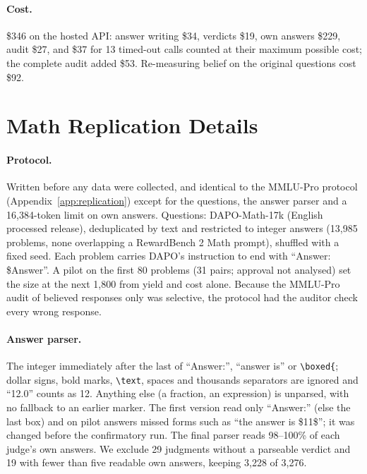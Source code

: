 \documentclass[11pt]{article}
\begin{document}
\paragraph{Cost.} \$346 on the hosted API: answer writing \$34, verdicts \$19, own answers \$229, audit \$27,
and \$37 for 13 timed-out calls counted at their maximum possible cost; the complete audit added \$53.
Re-measuring belief on the original questions cost \$92.

\section{Math Replication Details}
\label{app:math}

\paragraph{Protocol.} Written before any data were collected, and identical to the MMLU-Pro protocol
(Appendix~\ref{app:replication}) except for the questions, the answer parser and a 16,384-token limit on own
answers. Questions: DAPO-Math-17k (English processed release), deduplicated by text and restricted to integer answers
(13,985 problems, none overlapping a RewardBench 2 Math prompt), shuffled with a fixed seed. Each problem carries
DAPO's instruction to end with ``Answer: \$Answer''. A pilot on the first 80 problems (31 pairs; approval not
analysed) set the size at the next 1,800 from yield and cost alone. Because the MMLU-Pro audit of believed responses
only was selective, the protocol had the auditor check every wrong response.

\paragraph{Answer parser.} The integer immediately after the last of ``Answer:'', ``answer is'' or
\texttt{\textbackslash boxed\{}; dollar signs, bold marks, \texttt{\textbackslash text}, spaces and thousands
separators are ignored and ``12.0'' counts as 12. Anything else (a fraction, an expression) is unparsed, with no
fallback to an earlier marker. The first version read only ``Answer:'' (else the last box) and on pilot answers
missed forms such as ``the answer is \$11\$''; it was changed before the confirmatory run. The final parser reads
98--100\% of each judge's own answers. We exclude 29 judgments without a parseable verdict and 19 with fewer than five
readable own answers, keeping 3,228 of 3,276.
\end{document}
